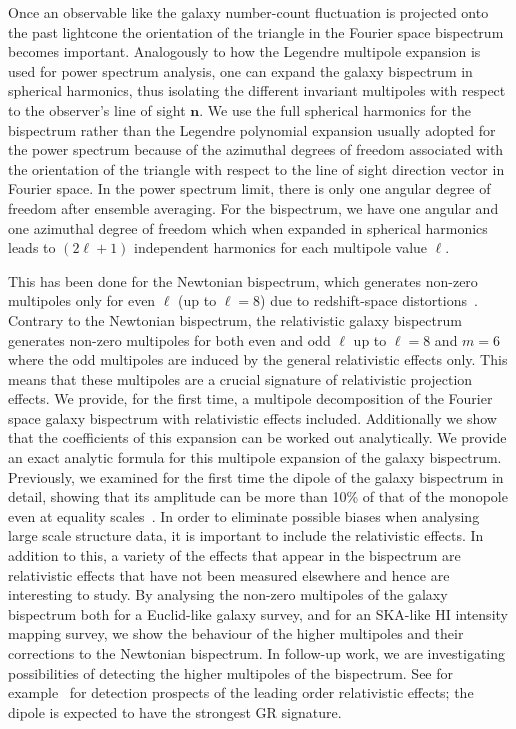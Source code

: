 Once an observable like the galaxy number-count fluctuation is projected onto the past lightcone the orientation of the triangle in the Fourier space bispectrum becomes important. 
Analogously to how the Legendre multipole expansion is used for power spectrum analysis, one can expand the galaxy bispectrum in spherical harmonics, thus isolating the different invariant multipoles with respect to the observer's line of sight $\bm n$. We use the full spherical harmonics for the bispectrum rather than the Legendre polynomial expansion usually adopted for the power spectrum because of the azimuthal degrees of freedom associated with the orientation of the triangle with respect to the line of sight direction vector in Fourier space. In the power spectrum limit, there is only one angular degree of freedom after ensemble averaging. For the bispectrum, we have one angular and one azimuthal degree of freedom which when expanded in spherical harmonics leads to $(2\ell + 1)$ independent harmonics for each multipole value $\ell$. 

This has been done for the Newtonian bispectrum, which generates non-zero multipoles only for even 
\(\ell\) (up to \(\ell = 8\)) due to redshift-space distortions~\cite{Scoccimarro:1999ed,Nan:2017oaq}. Contrary to the Newtonian bispectrum, the relativistic galaxy bispectrum generates non-zero multipoles for both even and odd \(\ell\) up to \(\ell = 8\) and \(m = 6\) where the odd multipoles are induced by the general relativistic effects only. This means that these multipoles are a crucial signature of relativistic projection effects. We provide, for the first time, a multipole decomposition of the Fourier space galaxy bispectrum with relativistic effects included. Additionally we show that the coefficients of this expansion can be worked out analytically. We provide an exact analytic formula for this multipole expansion of the galaxy bispectrum. Previously, we examined for the first time the dipole of the galaxy bispectrum in detail, showing that its amplitude can be more than 10\% of that of the monopole even at equality scales~\cite{Clarkson:2018dwn}. 
In order to eliminate possible biases when analysing large scale structure data, it is important to include the relativistic effects. In addition to this, a variety of the effects that appear in the bispectrum are relativistic effects that have not been measured elsewhere and hence are interesting to study. By analysing the non-zero multipoles of the galaxy bispectrum both for a Euclid-like galaxy survey, and for an SKA-like HI intensity mapping survey, we show the behaviour of the higher multipoles and their corrections to the Newtonian bispectrum. In follow-up work, we are investigating possibilities of detecting the higher multipoles of the bispectrum. See for example~\cite{Maartens:2019yhx} for detection prospects of the leading order relativistic effects; the dipole is expected to have the strongest GR signature. 

